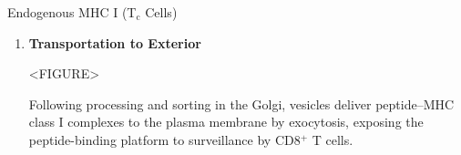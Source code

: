 \begin{core}[label=core:endogenous_mhci]{Endogenous MHC I (T$_{\text{c}}$ Cells)}
\begin{enumerate}[label=(\arabic*)]
\begin{enumerate}
          \end{enumerate}

        \item \textbf{Transportation to Exterior}

          <FIGURE>

          Following processing and sorting in the Golgi, vesicles deliver peptide--MHC class I complexes to the plasma membrane by exocytosis, exposing the peptide-binding platform to surveillance by CD8$^+$ T cells.

      \end{enumerate}

    \end{core}

